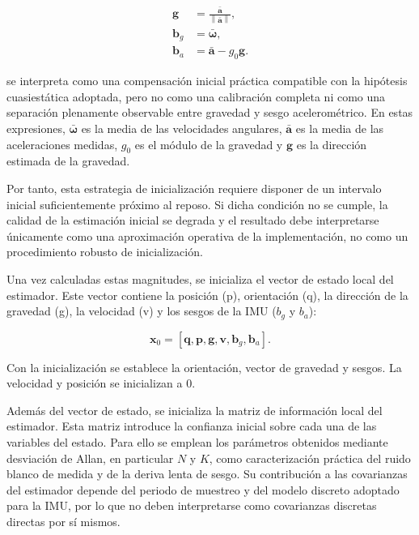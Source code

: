 \begin{equation}
\begin{aligned}
    \mathbf{g}
    &=
    \frac{\bar{\mathbf{a}}}
    {\left\|\bar{\mathbf{a}}\right\|},
    \\
    \mathbf{b}_g
    &=
    \bar{\boldsymbol{\omega}},
    \\
    \mathbf{b}_a
    &=
    \bar{\mathbf{a}}
    -
    g_0 \mathbf{g}.
\end{aligned}
\end{equation}

se interpreta como una compensación inicial práctica compatible con la hipótesis cuasiestática adoptada, pero no como una 
calibración completa ni como una separación plenamente observable entre gravedad y sesgo acelerométrico. En estas expresiones, 
$\bar{\boldsymbol{\omega}}$ es la media de las velocidades angulares, $\bar{\mathbf{a}}$ es la media de las aceleraciones 
medidas, $g_0$ es el módulo de la gravedad y $\mathbf{g}$ es la dirección estimada de la gravedad.

Por tanto, esta estrategia de inicialización requiere disponer de un intervalo inicial suficientemente próximo al reposo. Si dicha condición no se cumple, la calidad de la estimación inicial se degrada y el resultado debe interpretarse únicamente como una aproximación operativa de la implementación, no como un procedimiento robusto de inicialización.

Una vez calculadas estas magnitudes, se inicializa el vector de estado local del estimador. Este vector contiene la posición (p), 
    orientación (q), la dirección de la gravedad (g), la velocidad (v) y los sesgos de la IMU (\(b_g\) y \(b_a\)):

\begin{equation}
    \mathbf{x}_0
    =
    \left[
        \mathbf{q},
        \mathbf{p},
        \mathbf{g},
        \mathbf{v},
        \mathbf{b}_g,
        \mathbf{b}_a
    \right].
\end{equation}


Con la inicialización se establece la orientación, vector de gravedad y sesgos. La 
velocidad y posición se inicializan a 0.

Además del vector de estado, se inicializa la matriz de información local del estimador. Esta matriz introduce la confianza inicial 
sobre cada una de las variables del estado. Para ello se emplean los parámetros obtenidos mediante desviación de Allan, en particular 
\(N\) y \(K\), como caracterización práctica del ruido blanco de medida y de la deriva lenta de sesgo. Su contribución a las 
covarianzas del estimador depende del periodo de muestreo y del modelo discreto adoptado para la IMU, por lo que no deben 
interpretarse como covarianzas discretas directas por sí mismos.

